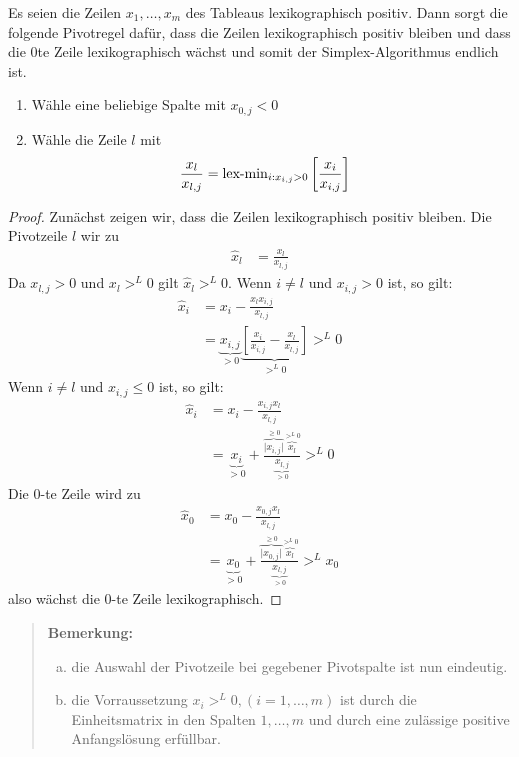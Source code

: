 \begin{theorem}
Es seien die Zeilen $x_1, \dotsc, x_m$ des Tableaus lexikographisch positiv. Dann sorgt die folgende Pivotregel dafür, dass die Zeilen lexikographisch positiv bleiben und dass die $0$te Zeile lexikographisch wächst und somit der Simplex-Algorithmus endlich ist.
\begin{enumerate}
\item Wähle eine beliebige Spalte mit $x_{0,j} < 0$
\item Wähle die Zeile $l$ mit
\begin{align*}
\frac{x_l}{x_{l,j}} &= \operatorname{lex-min}_{i:x_{i,j} > 0} \left \lbrack \frac{x_i}{x_{i,j}} \right \rbrack
\end{align*}
\end{enumerate}
\end{theorem}
\begin{proof}
Zunächst zeigen wir, dass die Zeilen lexikographisch positiv bleiben.
Die Pivotzeile $l$ wir zu
\begin{align*}
\hat{x}_l &= \frac{x_l}{x_{l,j}}
\end{align*}
Da $x_{l,j} > 0$ und $x_l >^L 0$ gilt $\hat{x}_l >^L 0$. Wenn $i \neq l$ und $x_{i,j} > 0$ ist, so gilt:
\begin{align*}
\hat{x}_i &= x_i - \frac{x_lx_{i,j}}{x_{l,j}} \\
&= \underbrace{x_{i,j}}_{>0} \underbrace{ \left \lbrack \frac{x_i}{x_{i,j}} - \frac{x_l}{x_{l,j}} \right \rbrack }_{>^L 0} >^L 0
\end{align*}
Wenn $i \neq l$ und $x_{i,j} \leq 0$ ist, so gilt:
\begin{align*}
\hat{x}_i &= x_i - \frac{x_{i,j} x_l}{x_{l,j}} \\
&= \underbrace{x_i}_{>0} + \frac{\overbrace{\lvert x_{i,j} \rvert}^{\geq 0} \overbrace{x_l}^{>^L 0}}{\underbrace{x_{l,j}}_{>0}} >^L 0
\end{align*}
Die $0$-te Zeile wird zu
\begin{align*}
\hat{x}_0 &= x_0 - \frac{x_{0,j} x_l}{x_{l,j}} \\
&= \underbrace{x_0}_{>0} + \frac{\overbrace{\lvert x_{0,j} \rvert}^{\geq 0} \overbrace{x_l}^{>^L 0}}{\underbrace{x_{l,j}}_{>0}} >^L x_0
\end{align*}
also wächst die $0$-te Zeile lexikographisch.
\end{proof}
\begin{quote}
\textbf{Bemerkung: }
\begin{enumerate}[a)]
\item die Auswahl der Pivotzeile bei gegebener Pivotspalte ist nun eindeutig.
\item die Vorraussetzung $x_i >^L 0, (i = 1,\dotsc,m)$ ist durch die Einheitsmatrix in den Spalten $1,\dotsc,m$ und durch eine zulässige positive Anfangslösung erfüllbar.
\end{enumerate}
\end{quote}
